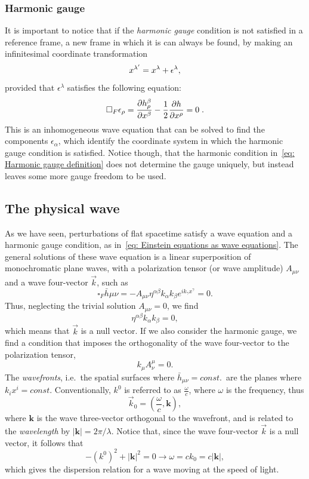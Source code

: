 \subsubsection{Harmonic gauge}
It is important to notice that if the \textit{harmonic gauge} condition is not satisfied in a reference frame, a new frame in which it is can always be found, by making an infinitesimal coordinate transformation
\begin{equation}
    x^{\lambda'} = x^\lambda + \epsilon^\lambda,
    \notag
\end{equation}
provided that $\epsilon^\lambda$ satisfies the following equation:
\[
    \square_F\epsilon_\rho = \frac{\partial h^\beta_\rho}{\partial x^\beta} - \frac{1}{2} \frac{\partial h}{\partial x^\rho} = 0\hspace{1mm}.
\]
This is an inhomogeneous wave equation that can be solved to find the components $\epsilon_\alpha$, which identify the coordinate system in which the harmonic gauge condition is satisfied.
Notice though, that the harmonic condition in~\eqref{eq: Harmonic gauge definition} does not determine the gauge uniquely, but instead leaves some more gauge freedom to be used.

\subsection{The physical wave}
As we have seen, perturbations of flat spacetime satisfy a wave equation and a harmonic gauge condition, as in~\eqref{eq: Einstein equations as wave equations}.
The general solutions of these wave equation is a linear superposition of monochromatic plane waves, with a polarization tensor (or wave amplitude) $A_{\mu\nu}$ and a wave four-vector $\vec{k}$, such as
\[
    \square_F \bar{h}{\mu\nu} = -A_{\mu\nu}\eta^{\alpha\beta} k_\alpha k_\beta e^{ik_\gamma x^\gamma} = 0.
\]
Thus, neglecting the trivial solution $A_{\mu\nu} = 0$, we find
\[
    \eta^{\alpha\beta} k_\alpha k_\beta = 0,
\]
which means that $\vec{k}$ is a null vector.
If we also consider the harmonic gauge, we find a condition that imposes the orthogonality  of the wave four-vector to the polarization tensor,
\[
    k_\mu A^\mu_\nu = 0.
\]
The \textit{wavefronts}, i.e.\ the spatial surfaces where $\bar{h}_{\mu\nu}= const$.\ are the planes where $k_i x^i=const$.
Conventionally, $k^0$ is referred to as $\frac{\omega}{c}$, where $\omega$ is the frequency, thus
\[
    \vec{k}_0 = \left(\frac{\omega}{c},\mathbf{k}\right),
\]
where $\mathbf{k}$ is the wave three-vector orthogonal to the wavefront, and is related to the \textit{wavelength} by $|\mathbf{k}| = 2\pi/\lambda$.
Notice that, since the wave four-vector $\vec{k}$ is a null vector, it follows that
\[
    -{(k^0)}^2 + |\mathbf{k}|^2 = 0 \to \omega = ck_0 = c|\mathbf{k}|,
\]
which gives the dispersion relation for a wave moving at the speed of light.


